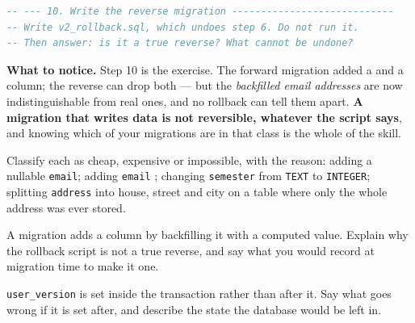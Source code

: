 \begin{lab}
\begin{lstlisting}[language=sql]
-- --- 10. Write the reverse migration ----------------------------
-- Write v2_rollback.sql, which undoes step 6. Do not run it.
-- Then answer: is it a true reverse? What cannot be undone?
\end{lstlisting}

\smallskip
\textbf{What to notice.} Step 10 is the exercise. The forward migration added a
 and a column; the reverse can drop both --- but the
\emph{backfilled email addresses} are now indistinguishable from real ones,
and no rollback can tell them apart. \textbf{A migration that writes data is
not reversible, whatever the script says}, and knowing which of your
migrations are in that class is the whole of the skill.
\end{lab}

\begin{checkpoint}
\begin{tightnum}
  \item Classify each as cheap, expensive or impossible, with the reason:
        adding a nullable \texttt{email}; adding \texttt{email} ; changing \texttt{semester} from \texttt{TEXT} to
        \texttt{INTEGER}; splitting \texttt{address} into house, street and
        city on a table where only the whole address was ever stored.
  \item A migration adds a  column by backfilling it with a
        computed value. Explain why the rollback script is not a true reverse,
        and say what you would record at migration time to make it one.
  \item {} \texttt{user\_version} is set inside the transaction
        rather than after it. Say what goes wrong if it is set after, and
        describe the state the database would be left in.
\end{tightnum}
\end{checkpoint}

